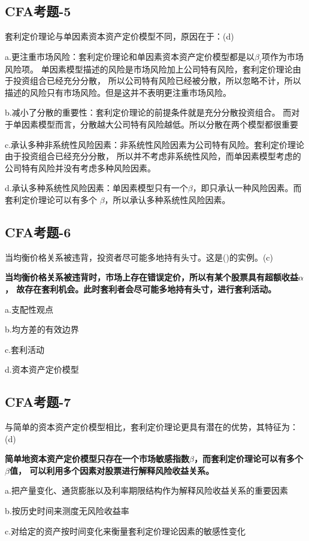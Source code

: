 \documentclass{article}
\begin{document}
\subsection*{CFA考题-5}
套利定价理论与单因素资本资产定价模型不同，原因在于：(d)

a.更注重市场风险：套利定价理论和单因素资本资产定价模型都是以$\beta_i$项作为市场风险项。
单因素模型描述的风险是市场风险加上公司特有风险，套利定价理论由于投资组合已经充分分散，
所以公司特有风险已经被分散，所以忽略不计，所以描述的风险只有市场风险。但是这并不表明更注重市场风险。

b.减小了分散的重要性：套利定价理论的前提条件就是充分分散投资组合。
而对于单因素模型而言，分散越大公司特有风险越低。所以分散在两个模型都很重要

c.承认多种非系统性风险因素：非系统性风险因素为公司特有风险。套利定价理论由于投资组合已经充分分散，
所以并不考虑非系统性风险，而单因素模型考虑的公司特有风险并没有考虑多种风险因素。

d.承认多种系统性风险因素：单因素模型只有一个$\beta$，即只承认一种风险因素。而套利定价理论可以有多个
$\beta$，所以承认多种系统性风险因素。

\subsection*{CFA考题-6}
当均衡价格关系被违背，投资者尽可能多地持有头寸。这是()的实例。(c)

\textbf{当均衡价格关系被违背时，市场上存在错误定价，所以有某个股票具有超额收益$\alpha$，
故存在套利机会。此时套利者会尽可能多地持有头寸，进行套利活动。}

a.支配性观点

b.均方差的有效边界

c.套利活动

d.资本资产定价模型

\subsection*{CFA考题-7}
与简单的资本资产定价模型相比，套利定价理论更具有潜在的优势，其特征为：(d)

\textbf{简单地资本资产定价模型只存在一个市场敏感指数$\beta$，而套利定价理论可以有多个$\beta$值，
可以利用多个因素对股票进行解释风险收益关系。}

a.把产量变化、通货膨胀以及利率期限结构作为解释风险收益关系的重要因素

b.按历史时间来测度无风险收益率

c.对给定的资产按时间变化来衡量套利定价理论因素的敏感性变化
\end{document}

